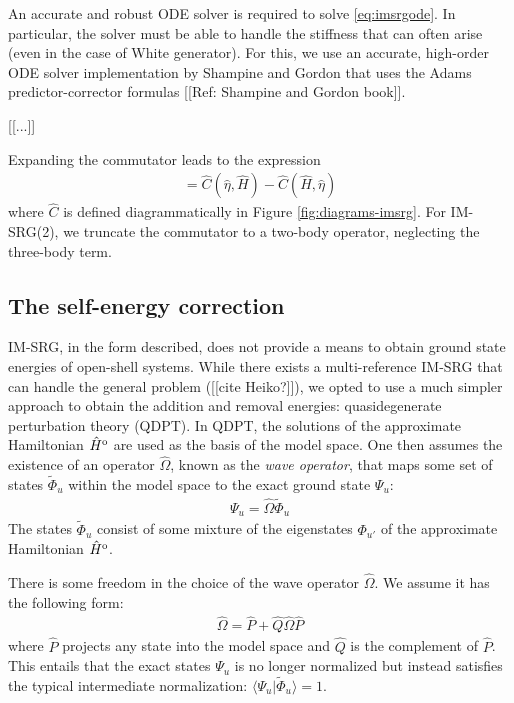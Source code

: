 \documentclass[amsmath, amssymb, aps, floatfix, nofootinbib, preprintnumbers,showpacs, superscriptaddress, twocolumn]{revtex4-1}
\begin{document}
An accurate and robust ODE solver is required to solve \eqref{eq:imsrgode}.
In particular, the solver must be able to handle the stiffness that can often
arise (even in the case of White generator).  For this, we use an accurate,
high-order ODE solver implementation by Shampine and Gordon that uses the
Adams predictor-corrector formulas [[Ref: Shampine and Gordon book]].

[[...]]

Expanding the commutator leads to the expression
\begin{align*}
  [\hat \eta, \hat H] = \hat C(\hat \eta, \hat H) - \hat C(\hat H, \hat \eta)
\end{align*}
where $\hat C$ is defined diagrammatically in Figure \ref{fig:diagrams-imsrg}.
For IM-SRG(2), we truncate the commutator to a two-body operator, neglecting
the three-body term.

\subsection{The self-energy correction}
\label{subsec:selfenergy}

IM-SRG, in the form described, does not provide a means to obtain ground state
energies of open-shell systems.  While there exists a multi-reference IM-SRG
that can handle the general problem ([[cite Heiko?]]), we opted to use a much
simpler approach to obtain the addition and removal energies: quasidegenerate
perturbation theory (QDPT).  In QDPT, the solutions of the approximate
Hamiltonian $\hat H^{\text o}$ are used as the basis of the model space.  One
then assumes the existence of an operator $\hat \Omega$, known as the
\textit{wave operator}, that maps some set of states $\tilde \Phi_u$ within
the model space to the exact ground state $\Psi_u$:
\begin{align} \label{eq:omega-condition1}
  \Psi_u = \hat \Omega \tilde \Phi_u
\end{align}
The states $\tilde \Phi_u$ consist of some mixture of the eigenstates
$\Phi_{u'}$ of the approximate Hamiltonian $\hat H^{\text o}$.

There is some freedom in the choice of the wave operator $\hat \Omega$.  We
assume it has the following form:
\begin{align} \label{eq:omega-condition2}
  \hat \Omega = \hat P + \hat Q \hat \Omega \hat P
\end{align}
where $\hat P$ projects any state into the model space and $\hat Q$ is the
complement of $\hat P$.  This entails that the exact states $\Psi_u$ is no
longer normalized but instead satisfies the typical intermediate
normalization: $\langle \Psi_u | \tilde \Phi_u \rangle = 1$.
\end{document}
